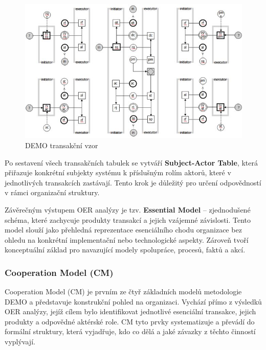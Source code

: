 \begin{figure}[H]
  \centering
  \includegraphics[width=\textwidth]{images/demo_transaction_pattern.png}
  \caption{DEMO transakční vzor \cite{Gouveia2017}}
  \label{fig:demo_transaction_pattern}
\end{figure}

Po sestavení všech transakčních tabulek se vytváří \textbf{Subject-Actor Table}, která přiřazuje konkrétní subjekty systému k příslušným rolím aktorů, které v jednotlivých transakcích zastávají. Tento krok je důležitý pro určení odpovědností v rámci organizační struktury. \cite{Pergl2023DEMO_modely}

Závěrečným výstupem OER analýzy je tzv. \textbf{Essential Model} – zjednodušené schéma, které zachycuje produkty transakcí a jejich vzájemné závislosti. Tento model slouží jako přehledná reprezentace esenciálního chodu organizace bez ohledu na konkrétní implementační nebo technologické aspekty. Zároveň tvoří konceptuální základ pro navazující modely spolupráce, procesů, faktů a akcí. \cite{Dietz2020}



\subsubsection{Cooperation Model (CM)}
\label{sec:cooperation-model}

Cooperation Model (CM) je prvním ze čtyř základních modelů metodologie DEMO a představuje konstrukční pohled na organizaci. Vychází přímo z výsledků OER analýzy, jejíž cílem bylo identifikovat jednotlivé esenciální transakce, jejich produkty a odpovědné aktérské role. CM tyto prvky systematizuje a převádí do formální struktury, která vyjadřuje, kdo co dělá a jaké závazky z těchto činností vyplývají. \cite{Dietz2020}

